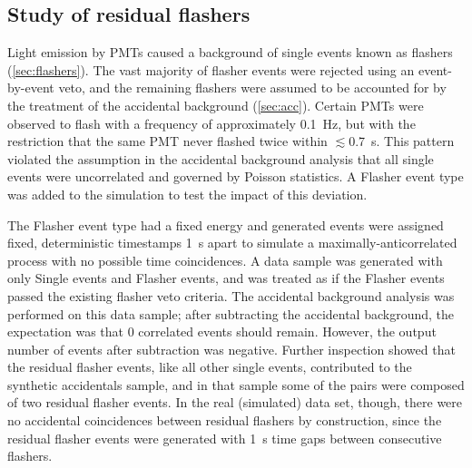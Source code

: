 \subsection{Study of residual flashers}
\label{subsec:toymc_flashers}

Light emission by PMTs caused a background of single events
known as flashers (\cref{sec:flashers}).
The vast majority of flasher events were rejected using an event-by-event veto,
and the remaining flashers were assumed to be accounted for
by the treatment of the accidental background (\cref{sec:acc}).
Certain PMTs were observed to flash with a frequency
of approximately \SI{0.1}{\Hz},
but with the restriction that
the same PMT never flashed twice within $\lesssim$\SI{0.7}{\s}.
This pattern violated the assumption in the accidental background analysis
that all single events were uncorrelated and governed by Poisson statistics.
A Flasher event type was added to the simulation to test the impact of this deviation.

The Flasher event type had a fixed energy
and generated events were assigned fixed, deterministic timestamps \SI{1}{\s} apart
to simulate a maximally-anticorrelated process with no possible time coincidences.
A data sample was generated with only Single events and Flasher events,
and was treated as if the Flasher events passed the existing flasher veto criteria.
The accidental background analysis was performed on this data sample;
after subtracting the accidental background,
the expectation was that 0 correlated events should remain.
However, the output number of events after subtraction was negative.
Further inspection showed that the residual flasher events,
like all other single events,
contributed to the synthetic accidentals sample,
and in that sample some of the pairs
were composed of two residual flasher events.
In the real (simulated) data set, though,
there were no accidental coincidences between residual flashers by construction,
since the residual flasher events were generated with \SI{1}{\s} time gaps
between consecutive flashers.



